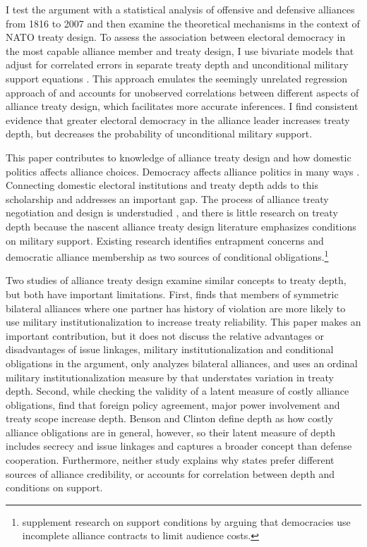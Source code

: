 \documentclass[12pt]{article}
\begin{document}
I test the argument with a statistical analysis of offensive and defensive alliances from 1816 to 2007 and then examine the theoretical mechanisms in the context of NATO treaty design.
To assess the association between electoral democracy in the most capable alliance member and treaty design, I use bivariate models that adjust for correlated errors in separate treaty depth and unconditional military support equations \citep{Braumoelleretal2018}. 
This approach emulates the seemingly unrelated regression approach of \citet{FjelstulReiter2019} and accounts for unobserved correlations between different aspects of alliance treaty design, which facilitates more accurate inferences. 
I find consistent evidence that greater electoral democracy in the alliance leader increases treaty depth, but decreases the probability of unconditional military support. 


This paper contributes to knowledge of alliance treaty design and how domestic politics affects alliance choices.
Democracy affects alliance politics in many ways \citep{LaiReiter2000, GiblerWolford2006, Mattes2012a, Warren2016, McManusYarhi-Milo2017}. 
Connecting domestic electoral institutions and treaty depth adds to this scholarship and addresses an important gap.
The process of alliance treaty negotiation and design is understudied \citep{Poast2019a}, and there is little research on treaty depth because the nascent alliance treaty design literature emphasizes conditions on military support.
Existing research identifies entrapment concerns \citep{Kim2011, Benson2012} and democratic alliance membership \citep{Mattes2012, Chibaetal2015} as two sources of conditional obligations.\footnote{\citet{FjelstulReiter2019} supplement research on support conditions by arguing that democracies use incomplete alliance contracts to limit audience costs.} 


Two studies of alliance treaty design examine similar concepts to treaty depth, but both have important limitations.   
First, \citet{Mattes2012} finds that members of symmetric bilateral alliances where one partner has history of violation are more likely to use military institutionalization to increase treaty reliability. 
This paper makes an important contribution, but it does not discuss the relative advantages or disadvantages of issue linkages, military institutionalization and conditional obligations in the argument, only analyzes bilateral alliances, and uses an ordinal military institutionalization measure by \citet{LeedsAnac2005} that understates variation in treaty depth.  
Second, while checking the validity of a latent measure of costly alliance obligations, \citet{BensonClinton2016} find that foreign policy agreement, major power involvement and treaty scope increase depth. 
Benson and Clinton define depth as how costly alliance obligations are in general, however, so their latent measure of depth includes secrecy and issue linkages and captures a broader concept than defense cooperation. 
Furthermore, neither study explains why states prefer different sources of alliance credibility, or accounts for correlation between depth and conditions on support. 
\end{document}
